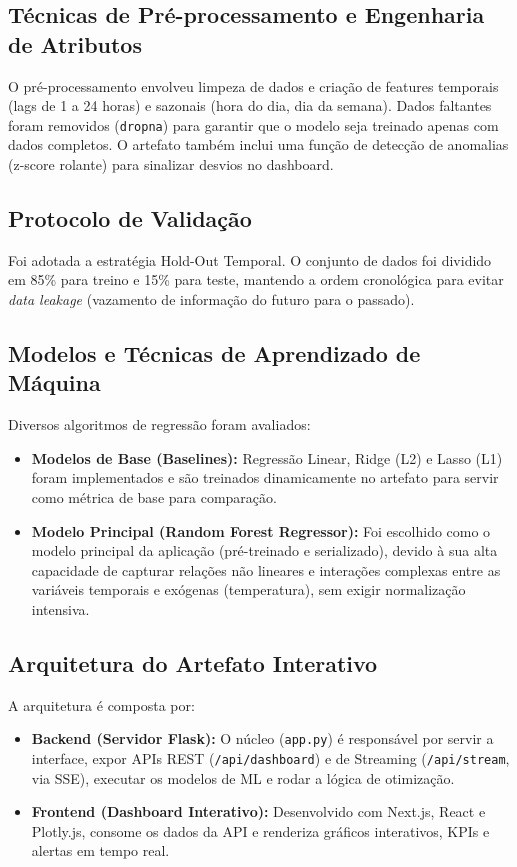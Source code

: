 \documentclass[conference]{IEEEtran}
\begin{document}
\subsection{Técnicas de Pré-processamento e Engenharia de Atributos}
O pré-processamento envolveu limpeza de dados e criação de features temporais (lags de 1 a 24 horas) e sazonais (hora do dia, dia da semana). Dados faltantes foram removidos (\texttt{dropna}) para garantir que o modelo seja treinado apenas com dados completos. O artefato também inclui uma função de detecção de anomalias (z-score rolante) para sinalizar desvios no dashboard.

\subsection{Protocolo de Validação}
Foi adotada a estratégia Hold-Out Temporal. O conjunto de dados foi dividido em 85\% para treino e 15\% para teste, mantendo a ordem cronológica para evitar \textit{data leakage} (vazamento de informação do futuro para o passado).

\subsection{Modelos e Técnicas de Aprendizado de Máquina}
Diversos algoritmos de regressão foram avaliados:
\begin{itemize}
    \item \textbf{Modelos de Base (Baselines):} Regressão Linear, Ridge (L2) e Lasso (L1) foram implementados e são treinados dinamicamente no artefato para servir como métrica de base para comparação.
    \item \textbf{Modelo Principal (Random Forest Regressor):} Foi escolhido como o modelo principal da aplicação (pré-treinado e serializado), devido à sua alta capacidade de capturar relações não lineares e interações complexas entre as variáveis temporais e exógenas (temperatura), sem exigir normalização intensiva.
\end{itemize}

\subsection{Arquitetura do Artefato Interativo}
A arquitetura é composta por:
\begin{itemize}
    \item \textbf{Backend (Servidor Flask):} O núcleo (\texttt{app.py}) é responsável por servir a interface, expor APIs REST (\texttt{/api/dashboard}) e de Streaming (\texttt{/api/stream}, via SSE), executar os modelos de ML e rodar a lógica de otimização.
    \item \textbf{Frontend (Dashboard Interativo):} Desenvolvido com Next.js, React e Plotly.js, consome os dados da API e renderiza gráficos interativos, KPIs e alertas em tempo real.
\end{itemize}
\end{document}
